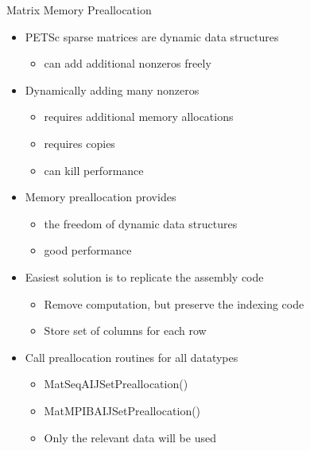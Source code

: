 \begin{frame}{Matrix Memory Preallocation}
\begin{itemize}
  \item PETSc sparse matrices are dynamic data structures
  \begin{itemize}
    \item can add additional nonzeros freely
  \end{itemize}

  \item Dynamically adding many nonzeros 
  \begin{itemize}
    \item requires additional memory allocations
    \item requires copies
    \item can kill performance
  \end{itemize}

  \item Memory preallocation provides
  \begin{itemize}
    \item the freedom of dynamic data structures
    \item good performance
  \end{itemize}

  \item Easiest solution is to replicate the assembly code
  \begin{itemize}
    \item Remove computation, but preserve the indexing code
    \item Store set of columns for each row
  \end{itemize}

  \item Call preallocation routines for all datatypes
  \begin{itemize}
    \item {\kb MatSeqAIJSetPreallocation()}
    \item {\kb MatMPIBAIJSetPreallocation()}
    \item Only the relevant data will be used
  \end{itemize}
\end{itemize}
\end{frame}

